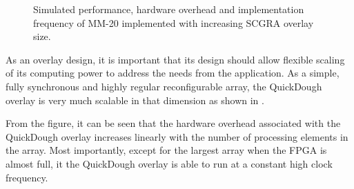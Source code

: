 \begin{figure}
\centering
{}
\hfill
{}
\caption{Simulated performance, hardware overhead and implementation frequency of MM-20 implemented with increasing SCGRA overlay size.}

\end{figure}


As an overlay design, it is important that its design should allow flexible scaling of its computing power to address the needs from the application.
As a simple, fully synchronous and highly regular reconfigurable array, the QuickDough overlay is very much scalable in that dimension as shown in 
.

From the figure, it can be seen that the hardware overhead associated with the QuickDough overlay increases linearly with the number of processing elements in the array.  Most importantly, except for the largest array when the FPGA is almost full, it the QuickDough overlay is able to run at a constant high clock frequency.



